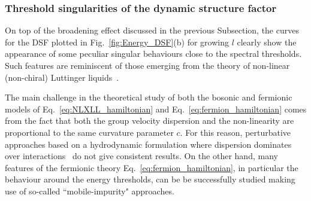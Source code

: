 \documentclass[twocolumn,pra,superscriptaddress,noshowpacs]{revtex4}
\begin{document}
\subsubsection{Threshold singularities of the dynamic structure factor}\label{subsec:dsf_exponent}

On top of the broadening effect discussed in the previous Subsection, the curves for the DSF plotted in Fig.~\ref{fig:Energy_DSF}(b) for growing $l$ clearly show the appearance of some peculiar singular behaviours %
close to the spectral thresholds. Such features are reminiscent of those emerging from the theory of non-linear (non-chiral) Luttinger liquids~\cite{ImambekovGlazman_RMP_2012}.

The main challenge in the theoretical study of both the bosonic and fermionic models of  Eq.~\eqref{eq:NLXLL_hamiltonian} and Eq.~\eqref{eq:fermion_hamiltonian} comes from the fact that both the group velocity dispersion and the non-linearity are proportional to the same curvature parameter $c$. For this reason, perturbative approaches based on a hydrodynamic formulation where dispersion dominates over interactions~\cite{PriceLamacraft_PRB_2014, PriceLamacraft_arxiv_2015} do not give consistent results. On the other hand, many features of the fermionic theory Eq.~\eqref{eq:fermion_hamiltonian}, in particular the behaviour around the energy thresholds, can be be successfully studied making use of so-called ``mobile-impurity" approaches. 
\end{document}
